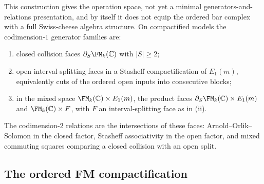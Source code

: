 \begin{remark}
This construction gives the operation space, not yet a minimal
generators-and-relations presentation, and by itself it does not
equip the ordered bar complex with a full Swiss-cheese algebra
structure. On compactified models the codimension-$1$ generator
families are:
\begin{enumerate}[label=\textup{(\roman*)}]
\item closed collision faces $\partial_S\FM_k(\mathbb C)$ with
 $|S|\ge 2$;
\item open interval-splitting faces in a Stasheff compactification
 of $E_1(m)$, equivalently cuts of the ordered open inputs into
 consecutive blocks;
\item in the mixed space $\FM_k(\mathbb C)\times E_1(m)$, the
 product faces $\partial_S\FM_k(\mathbb C)\times E_1(m)$ and
 $\FM_k(\mathbb C)\times F$, with $F$ an interval-splitting face
 as in \textup{(}ii\textup{)}.
\end{enumerate}
The codimension-$2$ relations are the intersections of these faces:
Arnold--Orlik--Solomon in the closed factor, Stasheff associativity
in the open factor, and mixed commuting squares comparing a closed
collision with an open split.
\end{remark}

\subsection{The ordered FM compactification}
\label{subsec:ordered-fm-compact}

